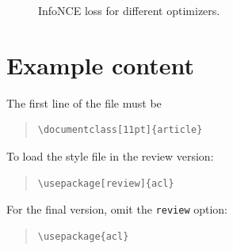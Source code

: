 \documentclass[11pt]{article}
\begin{document}
\begin{figure}[!tbp]
  \centering
  \caption{InfoNCE loss for different optimizers.}
  \label{fig:infoOpt}
\end{figure}



\newpage
 
\newpage
\section{Example content}
The first line of the file must be
\begin{quote}
\begin{verbatim}
\documentclass[11pt]{article}
\end{verbatim}
\end{quote}

To load the style file in the review version:
\begin{quote}
\begin{verbatim}
\usepackage[review]{acl}
\end{verbatim}
\end{quote}
For the final version, omit the \verb|review| option:
\begin{quote}
\begin{verbatim}
\usepackage{acl}
\end{verbatim}
\end{quote}
\end{document}
